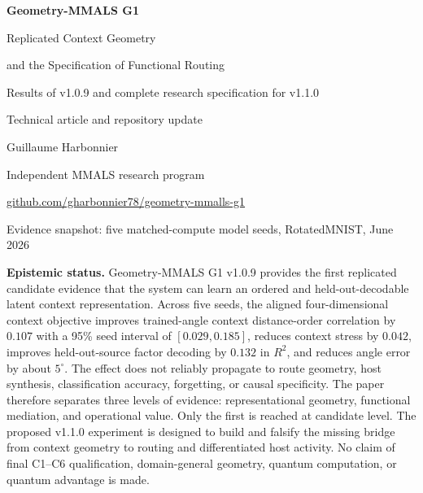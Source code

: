 \documentclass[11pt,a4paper]{article}
\begin{document}
\begin{titlepage}
\centering
\vspace*{0.7cm}
{\Huge\bfseries\color{deepblue} Geometry-MMALS G1\par}
\vspace{0.25cm}
{\LARGE Replicated Context Geometry\par}
\vspace{0.15cm}
{\LARGE and the Specification of Functional Routing\par}
\vspace{0.35cm}
{\Large Results of v1.0.9 and complete research specification for v1.1.0\par}
\vspace{0.5cm}
{\large Technical article and repository update\par}
\vspace{0.9cm}
{\Large Guillaume Harbonnier\par}
\vspace{0.2cm}
{\normalsize Independent MMALS research program\par}
\vspace{0.15cm}
{\normalsize \href{https://github.com/gharbonnier78/geometry-mmalls-g1}{github.com/gharbonnier78/geometry-mmalls-g1}\par}
\vspace{0.6cm}
{\normalsize Evidence snapshot: five matched-compute model seeds, RotatedMNIST, June 2026\par}
\vfill
\begin{minipage}{0.93\textwidth}
\small
\textbf{Epistemic status.} Geometry-MMALS G1 v1.0.9 provides the first replicated candidate evidence that the system can learn an ordered and held-out-decodable latent context representation. Across five seeds, the aligned four-dimensional context objective improves trained-angle context distance-order correlation by $0.107$ with a 95\% seed interval of $[0.029,0.185]$, reduces context stress by $0.042$, improves held-out-source factor decoding by $0.132$ in $R^2$, and reduces angle error by about $5^\circ$. The effect does not reliably propagate to route geometry, host synthesis, classification accuracy, forgetting, or causal specificity. The paper therefore separates three levels of evidence: representational geometry, functional mediation, and operational value. Only the first is reached at candidate level. The proposed v1.1.0 experiment is designed to build and falsify the missing bridge from context geometry to routing and differentiated host activity. No claim of final C1--C6 qualification, domain-general geometry, quantum computation, or quantum advantage is made.
\end{minipage}
\vfill
\end{titlepage}
\end{document}
